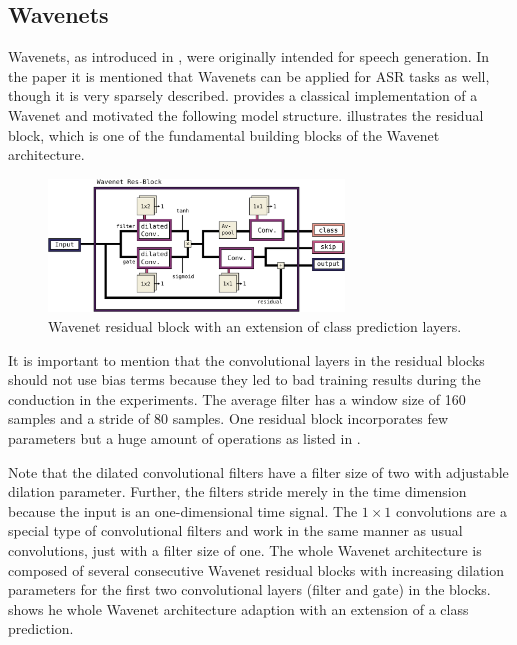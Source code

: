 \subsection{Wavenets}\label{sec:nn_arch_wavenet}
Wavenets, as introduced in \cite{Oord2016}, were originally intended for speech generation.
In the paper it is mentioned that Wavenets can be applied for ASR tasks as well, though it is very sparsely described.
\cite{Herrmann2018} provides a classical implementation of a Wavenet and motivated the following model structure.
 illustrates the residual block, which is one of the fundamental building blocks of the Wavenet architecture.
\begin{figure}[!ht]
  \centering
    \includegraphics[width=0.7\textwidth]{./4_nn/figs/nn_arch_wavenet_block.pdf}
  \caption{Wavenet residual block \cite{Oord2016} with an extension of class prediction layers.}
  \label{fig:nn_arch_wavenet_block}
\end{figure}
\FloatBarrier
\noindent
It is important to mention that the convolutional layers in the residual blocks should not use bias terms because they led to bad training results during the conduction in the experiments.
The average filter has a window size of 160 samples and a stride of 80 samples.
One residual block incorporates few parameters but a huge amount of operations as listed in .

Note that the dilated convolutional filters have a filter size of two with adjustable dilation parameter.
Further, the filters stride merely in the time dimension because the input is an one-dimensional time signal.
The $1 \times 1$ convolutions are a special type of convolutional filters and work in the same manner as usual convolutions, just with a filter size of one.
The whole Wavenet architecture is composed of several consecutive Wavenet residual blocks with increasing dilation parameters for the first two convolutional layers (filter and gate) in the blocks.
 shows he whole Wavenet architecture adaption with an extension of a class prediction.
